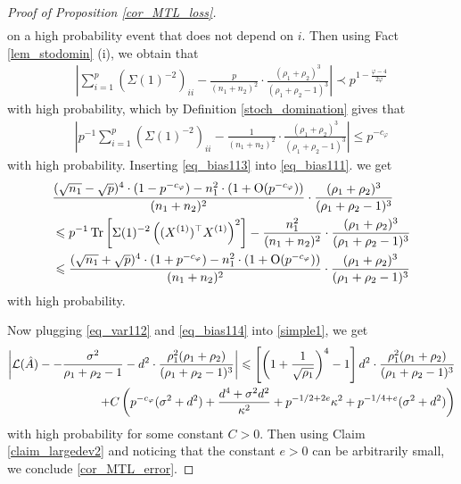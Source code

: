 \begin{proof}[Proof of Proposition \ref{cor_MTL_loss}]
\begin{align*}
\end{align*}
on a high probability event that does not depend on $i$. Then using Fact \ref{lem_stodomin} (i), we obtain that 
\begin{align*} 
\left| \sum_{i=1}^p \left(\Sigma(1)^{-2}\right)_{ii} - \frac{p}{(n_1+n_2)^2}\cdot \frac{(\rho_1+\rho_2)^3}{(\rho_1+\rho_2-1)^3}\right|\prec p^{1-\frac{\varphi-4}{2\varphi}}
\end{align*}
with high probability, which by Definition \ref{stoch_domination} gives that
\begin{align}\label{eq_bias113}
\left| p^{-1}\sum_{i=1}^p \left(\Sigma(1)^{-2}\right)_{ii} - \frac{1}{(n_1+n_2)^2}\cdot \frac{(\rho_1+\rho_2)^3}{(\rho_1+\rho_2-1)^3}\right|\le p^{-c_\varphi}
\end{align}
with high probability. Inserting \eqref{eq_bias113} into \eqref{eq_bias111}. we get
\begin{align}
& \frac{(\sqrt{n_1}-\sqrt{p})^4 \cdot (1- p^{-c_\varphi}) - n_1^2 \cdot (1+\OO(p^{-c_\varphi}))}{(n_1+n_2)^2}\cdot  \frac{(\rho_1+\rho_2)^3}{(\rho_1+\rho_2-1)^3}\nonumber \\
&\le  {p}^{-1}\tr\left[\Sigma(1)^{-2} \left((X^{(1)})^\top X^{(1)} \right)^2\right] - \frac{n_1^2}{(n_1+n_2)^2}\cdot  \frac{(\rho_1+\rho_2)^3}{(\rho_1+\rho_2-1)^3} \nonumber\\
&  \le \frac{(\sqrt{n_1}+\sqrt{p})^4 \cdot (1+ p^{-c_\varphi}) - n_1^2 \cdot (1+\OO(p^{-c_\varphi}))}{(n_1+n_2)^2}\cdot  \frac{(\rho_1+\rho_2)^3}{(\rho_1+\rho_2-1)^3}\label{eq_bias114}
\end{align}
with high probability. 

Now plugging \eqref{eq_var112} and \eqref{eq_bias114} into \eqref{simple1}, we get
\begin{align}
\left|\cal L(\hat A)- -\frac{\sigma^2}{\rho_1+\rho_2-1} - d^2\cdot \frac{\rho_1^2 (\rho_1+\rho_2)}{(\rho_1 + \rho_2 - 1)^3}\right| \le   \left[\left( 1+\frac{1}{\sqrt{\rho_1}}\right)^4-1\right] d^2\cdot \frac{\rho_1^2 (\rho_1+\rho_2)}{(\rho_1 + \rho_2 - 1)^3} \nonumber\\
+C\left( p^{-c_\varphi} (\sigma^2 + d^2)+ \frac{d^4 + \sigma^2 d^2}{\kappa^2}+p^{-1/2+2e}\kappa^2 +  p^{-1/4+e} (\sigma^2 +d^2) \right) \label{simple1add}
\end{align}
with high probability for some constant $C>0$. Then using Claim \ref{claim_largedev2} and noticing that the constant $e>0$ can be arbitrarily small, we conclude \eqref{cor_MTL_error}.
\end{proof}
